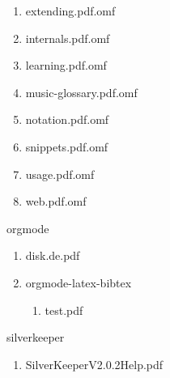 \documentclass[11pt]{article}
\begin{document}
\begin{enumerate}
\begin{enumerate}
\begin{enumerate}
\begin{enumerate}
\begin{enumerate}
\begin{enumerate}
\item extending.pdf.omf
\label{sec-1-1-1-1-46-10-3-1-2-1-1-4}

\item internals.pdf.omf
\label{sec-1-1-1-1-46-10-3-1-2-1-1-5}

\item learning.pdf.omf
\label{sec-1-1-1-1-46-10-3-1-2-1-1-6}

\item music-glossary.pdf.omf
\label{sec-1-1-1-1-46-10-3-1-2-1-1-7}

\item notation.pdf.omf
\label{sec-1-1-1-1-46-10-3-1-2-1-1-8}

\item snippets.pdf.omf
\label{sec-1-1-1-1-46-10-3-1-2-1-1-9}

\item usage.pdf.omf
\label{sec-1-1-1-1-46-10-3-1-2-1-1-10}

\item web.pdf.omf
\label{sec-1-1-1-1-46-10-3-1-2-1-1-11}
\end{enumerate}
\end{enumerate}
\end{enumerate}
\end{enumerate}
\end{enumerate}
\end{enumerate}

\item orgmode
\label{sec-1-1-1-1-46-11}
\begin{enumerate}
\item disk.de.pdf
\label{sec-1-1-1-1-46-11-1}

\item orgmode-latex-bibtex
\label{sec-1-1-1-1-46-11-2}
\begin{enumerate}
\item test.pdf
\label{sec-1-1-1-1-46-11-2-1}
\end{enumerate}
\end{enumerate}

\item silverkeeper
\label{sec-1-1-1-1-46-12}
\begin{enumerate}
\item SilverKeeperV2.0.2Help.pdf
\label{sec-1-1-1-1-46-12-1}
\end{enumerate}
\end{document}
